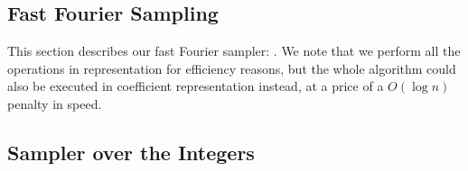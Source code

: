  \subsection{Fast Fourier Sampling}

 This section describes our fast Fourier sampler: \longffsampling. We note that we perform all the operations in \fft representation for efficiency reasons, but the whole algorithm could also be executed in coefficient representation instead, at a price of a $O(\log n)$ penalty in speed.


 \begin{algorithm}[!htb]
  \caption{$\ffsampling_{\ n}(\vect, \tree)$}\label{alg:ffsampling}
 \begin{algorithmic}[1]
  \label{line:samplerz0}
  \label{line:samplerz1}
  \EndIf
  \end{algorithmic}
 \end{algorithm}

\newpage

\subsection{Sampler over the Integers}\label{sec:spec:sign:integers}

